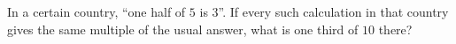 In a certain country, ``one half of $5$ is $3$''. If every such calculation in that country gives the same multiple of the usual answer, what is one third of $10$ there?
